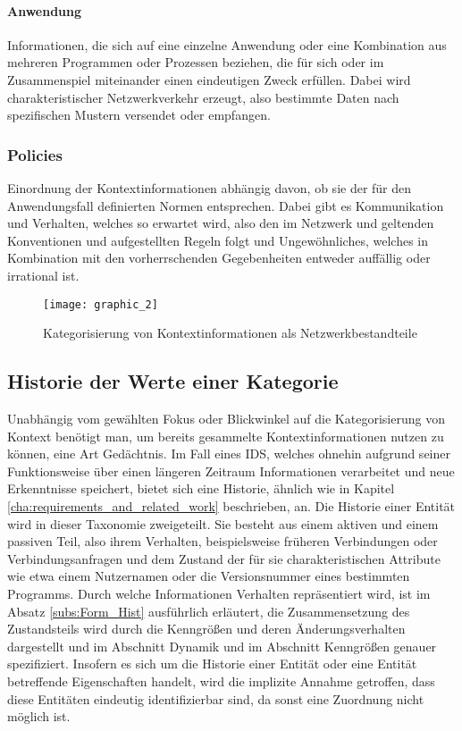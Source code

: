 \paragraph{Anwendung}
Informationen, die sich auf eine einzelne Anwendung oder eine Kombination aus mehreren Programmen oder Prozessen beziehen, die für sich oder im Zusammenspiel miteinander einen eindeutigen Zweck erfüllen. Dabei wird charakteristischer Netzwerkverkehr erzeugt, also bestimmte Daten nach spezifischen Mustern versendet oder empfangen.
\subsubsection{Policies}
Einordnung der Kontextinformationen abhängig davon, ob sie der für den Anwendungsfall definierten Normen entsprechen. Dabei gibt es Kommunikation und Verhalten, welches so erwartet wird, also den im Netzwerk und geltenden Konventionen und aufgestellten Regeln folgt und Ungewöhnliches, welches in Kombination mit den vorherrschenden Gegebenheiten entweder auffällig oder irrational ist.
\begin{figure}[H]
\centering
\texttt{[image: graphic\_2]}
\caption{Kategorisierung von Kontextinformationen als Netzwerkbestandteile}
\label{Tax_2} 
\end{figure}
\subsection{Historie der Werte einer Kategorie}
Unabhängig vom gewählten Fokus oder Blickwinkel auf die Kategorisierung von Kontext benötigt man, um bereits gesammelte Kontextinformationen nutzen zu können, eine Art Gedächtnis. Im Fall eines IDS, welches ohnehin aufgrund seiner Funktionsweise über einen längeren Zeitraum Informationen verarbeitet und neue Erkenntnisse speichert, bietet sich eine Historie, ähnlich wie in Kapitel \ref{cha:requirements_and_related_work} beschrieben, an.
Die Historie einer Entität wird in dieser Taxonomie zweigeteilt. Sie besteht aus einem aktiven und einem passiven Teil, also ihrem Verhalten, beispielsweise früheren Verbindungen oder Verbindungsanfragen und dem Zustand der für sie charakteristischen Attribute wie etwa einem Nutzernamen oder die Versionsnummer eines bestimmten Programms.
Durch welche Informationen Verhalten repräsentiert wird, ist im Absatz \ref{subs:Form_Hist} ausführlich erläutert, die Zusammensetzung des Zustandsteils wird durch die Kenngrößen und deren Änderungsverhalten dargestellt und im Abschnitt Dynamik und im Abschnitt Kenngrößen genauer spezifiziert. Insofern es sich um die Historie einer Entität oder eine Entität betreffende Eigenschaften handelt, wird die implizite Annahme getroffen, dass diese Entitäten eindeutig identifizierbar sind, da sonst eine Zuordnung nicht möglich ist.
